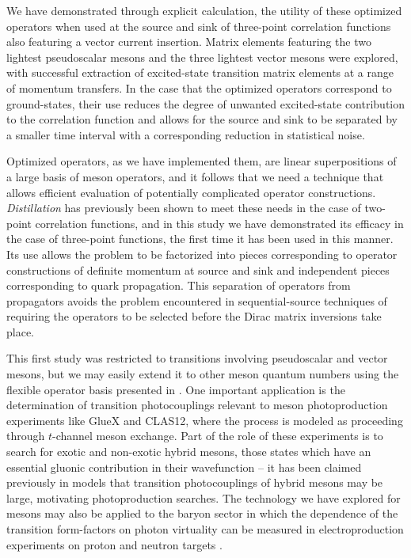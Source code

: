 \documentclass[twocolumn,amsmath,amssymb,prd,10pt,floatfix, 
superscriptaddress,nofootinbib, showpacs, preprintnumbers]{revtex4-1}
\begin{document}
We have demonstrated through explicit calculation, the utility of these optimized operators when used at the source and sink of three-point correlation functions also featuring a vector current insertion. Matrix elements featuring the two lightest pseudoscalar mesons and the three lightest vector mesons were explored, with successful extraction of excited-state transition matrix elements at a range of momentum transfers. In the case that the optimized operators correspond to ground-states, their use reduces the degree of unwanted excited-state contribution to the correlation function and allows for the source and sink to be separated by a smaller time interval with a corresponding reduction in statistical noise.

Optimized operators, as we have implemented them, are linear superpositions of a large basis of meson operators, and it follows that we need a technique that allows efficient evaluation of potentially complicated operator constructions. \emph{Distillation} has previously been shown to meet these needs in the case of two-point correlation functions, and in this study we have demonstrated its efficacy in the case of three-point functions, the first time it has been used in this manner. Its use allows the problem to be factorized into pieces corresponding to operator constructions of definite momentum at source and sink and independent pieces corresponding to quark propagation. This separation of operators from propagators avoids the problem encountered in sequential-source techniques of requiring the operators to be selected before the Dirac matrix inversions take place.

This first study was restricted to transitions involving pseudoscalar and vector mesons, but we may easily extend it to other meson quantum numbers using the flexible operator basis presented in \cite{Dudek:2010wm, Dudek:2009qf, Thomas:2011rh}. One important application is the determination of transition photocouplings relevant to meson photoproduction experiments like GlueX and CLAS12, where the process is modeled as proceeding through $t$-channel meson exchange. Part of the role of these experiments is to search for exotic and non-exotic hybrid mesons, those states which have an essential gluonic contribution in their wavefunction -- it has been claimed previously in models \cite{Isgur:1985vy, Isgur:1999kx, *Close:2003fz, *Close:2003ae} that transition photocouplings of hybrid mesons may be large, motivating photoproduction searches. The technology we have explored for mesons may also be applied to the baryon sector in which the dependence of the transition form-factors on photon virtuality can be measured in electroproduction experiments on proton and neutron targets \cite{Aznauryan:2012ba}. 
\end{document}
